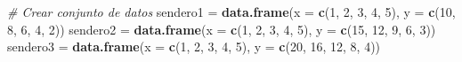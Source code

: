 \documentclass[
  spanish,
  12pt,
]{book}
\newenvironment{Shaded}{\begin{snugshade}}{\end{snugshade}}
\newcommand{\AttributeTok}[1]{\textcolor[rgb]{0.13,0.29,0.53}{#1}}
\newcommand{\CommentTok}[1]{\textcolor[rgb]{0.56,0.35,0.01}{\textit{#1}}}
\newcommand{\DecValTok}[1]{\textcolor[rgb]{0.00,0.00,0.81}{#1}}
\newcommand{\FunctionTok}[1]{\textcolor[rgb]{0.13,0.29,0.53}{\textbf{#1}}}
\newcommand{\NormalTok}[1]{#1}
\newcommand{\OtherTok}[1]{\textcolor[rgb]{0.56,0.35,0.01}{#1}}
\begin{document}
\begin{Shaded}
\begin{Highlighting}[]
\CommentTok{\# Crear conjunto de datos}
\NormalTok{sendero1 }\OtherTok{=} \FunctionTok{data.frame}\NormalTok{(}\AttributeTok{x =} \FunctionTok{c}\NormalTok{(}\DecValTok{1}\NormalTok{, }\DecValTok{2}\NormalTok{, }\DecValTok{3}\NormalTok{, }\DecValTok{4}\NormalTok{, }\DecValTok{5}\NormalTok{), }\AttributeTok{y =} \FunctionTok{c}\NormalTok{(}\DecValTok{10}\NormalTok{, }\DecValTok{8}\NormalTok{, }\DecValTok{6}\NormalTok{, }\DecValTok{4}\NormalTok{, }\DecValTok{2}\NormalTok{))}
\NormalTok{sendero2 }\OtherTok{=} \FunctionTok{data.frame}\NormalTok{(}\AttributeTok{x =} \FunctionTok{c}\NormalTok{(}\DecValTok{1}\NormalTok{, }\DecValTok{2}\NormalTok{, }\DecValTok{3}\NormalTok{, }\DecValTok{4}\NormalTok{, }\DecValTok{5}\NormalTok{), }\AttributeTok{y =} \FunctionTok{c}\NormalTok{(}\DecValTok{15}\NormalTok{, }\DecValTok{12}\NormalTok{, }\DecValTok{9}\NormalTok{, }\DecValTok{6}\NormalTok{, }\DecValTok{3}\NormalTok{))}
\NormalTok{sendero3 }\OtherTok{=} \FunctionTok{data.frame}\NormalTok{(}\AttributeTok{x =} \FunctionTok{c}\NormalTok{(}\DecValTok{1}\NormalTok{, }\DecValTok{2}\NormalTok{, }\DecValTok{3}\NormalTok{, }\DecValTok{4}\NormalTok{, }\DecValTok{5}\NormalTok{), }\AttributeTok{y =} \FunctionTok{c}\NormalTok{(}\DecValTok{20}\NormalTok{, }\DecValTok{16}\NormalTok{, }\DecValTok{12}\NormalTok{, }\DecValTok{8}\NormalTok{, }\DecValTok{4}\NormalTok{))}


\end{Highlighting}
\end{Shaded}
\end{document}
